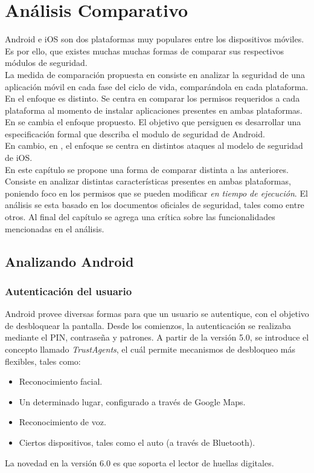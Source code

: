 \chapter{Análisis Comparativo}
Android e iOS son dos plataformas muy populares entre los dispositivos móviles. Es por ello, que existes muchas  muchas formas de comparar sus respectivos módulos de seguridad.\\

La medida de comparación propuesta en \cite{YA2014} consiste en analizar la seguridad de una aplicación móvil en cada fase del ciclo de vida, comparándola en cada plataforma.\\

En \cite{HYGZD13} el enfoque es distinto. Se centra en comparar los permisos requeridos a cada plataforma al momento de instalar aplicaciones presentes en ambas plataformas.\\

En \cite{Gor16, BCLR15, Rom14} se cambia el enfoque propuesto. El objetivo que persiguen es desarrollar una especificación formal que describa el modulo de seguridad de Android.\\

En cambio, en \cite{TZSH13}, el enfoque se centra en distintos ataques al modelo de seguridad de iOS.\\

En este capítulo se propone una forma de comparar distinta a las anteriores. Consiste en analizar distintas características presentes en ambas plataformas, poniendo foco en los permisos que se pueden modificar \emph{en tiempo de ejecución}. El análisis se esta basado en los documentos oficiales de seguridad, tales como \cite{aossec, asreview2015, asg} entre otros. Al final del capítulo se agrega una crítica sobre las funcionalidades mencionadas en el análisis.
\section{Analizando Android}
\subsection{Autenticación del usuario}
Android provee diversas formas para que un usuario se autentique, con el objetivo de desbloquear la pantalla. Desde los comienzos, la autenticación se realizaba mediante el PIN, contraseña y patrones. A partir de la versión 5.0, se introduce el concepto llamado \textit{TrustAgents}, el cuál permite mecanismos de desbloqueo más flexibles, tales como:
\begin{itemize}
	\item Reconocimiento facial.
	\item Un determinado lugar, configurado a través de Google Maps.
	\item Reconocimiento de voz.
	\item Ciertos dispositivos, tales como el auto (a través de Bluetooth).
\end{itemize}
La novedad en la versión 6.0 es que soporta el lector de huellas digitales.\\

